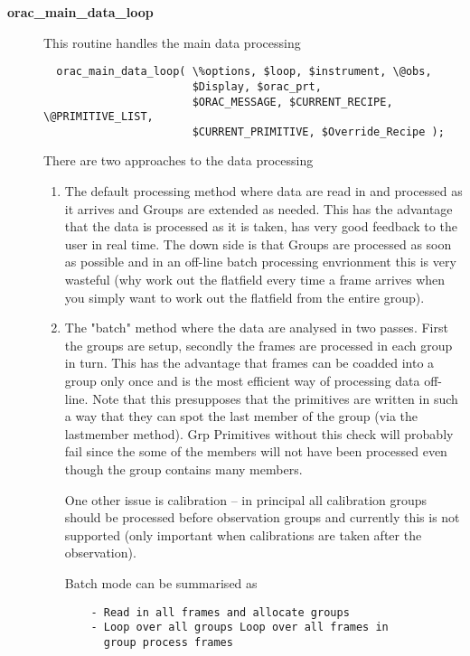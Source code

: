 \begin{description}
\item[{\textbf{orac\_main\_data\_loop}}] \mbox{}

This routine handles the main data processing

\begin{verbatim}
  orac_main_data_loop( \%options, $loop, $instrument, \@obs,
                       $Display, $orac_prt,
                       $ORAC_MESSAGE, $CURRENT_RECIPE, \@PRIMITIVE_LIST,
                       $CURRENT_PRIMITIVE, $Override_Recipe );
\end{verbatim}


There are two approaches to the data processing

\begin{enumerate}

\item

The default processing method where data are read in and processed as
it arrives and Groups are extended as needed. This has the advantage
that the data is processed as it is taken, has very good feedback to
the user in real time. The down side is that Groups are processed as
soon as possible and in an off-line batch processing envrionment this
is very wasteful (why work out the flatfield every time a frame
arrives when you simply want to work out the flatfield from the entire
group).


\item

The "batch" method where the data are analysed in two passes.  First
the groups are setup, secondly the frames are processed in each group
in turn. This has the advantage that frames can be coadded into a
group only once and is the most efficient way of processing data
off-line. Note that this presupposes that the primitives are written
in such a way that they can spot the last member of the group (via the
lastmember method). Grp Primitives without this check will probably
fail since the some of the members will not have been processed even
though the group contains many members.



One other issue is calibration -- in principal all calibration groups
should be processed before observation groups and currently this is
not supported (only important when calibrations are taken after the
observation).



Batch mode can be summarised as

\begin{verbatim}
    - Read in all frames and allocate groups
    - Loop over all groups Loop over all frames in
      group process frames
\end{verbatim}



\end{enumerate}
\end{description}
